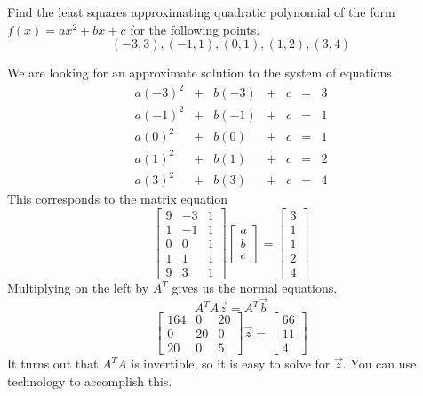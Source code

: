 \documentclass{ximera}
\begin{document}
 \begin{example}\label{ex:leastSquaresPoly}
Find the least squares approximating quadratic polynomial of the form $f(x)=ax^2+bx+c$ for the following points.
$$(-3, 3), (-1, 1), (0, 1), (1, 2), (3, 4)$$

\begin{explanation}
    We are looking for an approximate solution to the system of equations
    $$\begin{matrix}a(-3)^2&+&b(-3)&+&c&=&3\\a(-1)^2&+&b(-1)&+&c&=&1\\a(0)^2&+&b(0)&+&c&=&1\\a(1)^2&+&b(1)&+&c&=&2\\a(3)^2&+&b(3)&+&c&=&4\end{matrix}$$
    This corresponds to the matrix equation
    $$\begin{bmatrix}9&-3&1\\1&-1&1\\0&0&1\\1&1&1\\9&3&1\end{bmatrix}\begin{bmatrix}a\\b\\c\end{bmatrix}=\begin{bmatrix}3\\1\\1\\2\\4\end{bmatrix}$$
    Multiplying on the left by $A^T$ gives us the normal equations.
    $$A^TA\vec{z}=A^T\vec{b}$$
    $$\begin{bmatrix}164&0&20\\0&20&0\\20&0&5\end{bmatrix}\vec{z}=\begin{bmatrix}66\\11\\4\end{bmatrix}$$
     It turns out that $A^TA$ is invertible, so it is easy to solve for $\vec{z}$.  You can use technology to accomplish this.  



\end{explanation}
\end{example}
\end{document}
